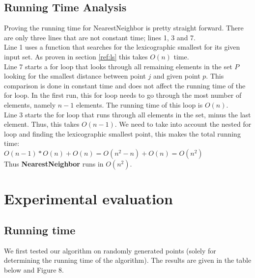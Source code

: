     \subsection{Running Time Analysis}
    \label{sub:running_time_analysis}
      Proving the running time for NearestNeighbor is pretty straight forward. There are only three lines that are not constant time; lines 1, 3 and 7. \\
       Line 1 uses a function that searches for the lexicographic smallest for its given input set. As proven in section \ref{ref:ls} this takes $O(n)$ time.\\
       Line 7 starts a for loop that looks through all remaining elements in the set $P$ looking for the smallest distance between point $j$ and given point $p$. This comparison is done in constant time and does not affect the running time of the for loop. In the first run, this for loop needs to go through the most number of elements, namely $n-1$ elements. The running time of this loop is $O(n)$. \\
       Line 3 starts the for loop that runs through all elements in the set, minus the last element. Thus, this takes $O(n-1)$. We need to take into account the nested for loop and finding the lexicographic smallest point, this makes the total running time: \\
       $O(n-1) * O(n) + O(n) =  O(n^{2} - n ) + O(n) = O(n^{2})$ \\
       Thus \textbf{NearestNeighbor} runs in $O(n^{2})$.

  \section{Experimental evaluation}
  \label{sec:experimental_evaluation}
    \subsection{Running time}
    We first tested our algorithm on randomly generated points (solely for determining the running time of the algorithm).
    The results are given in the table below and Figure 8.\\

